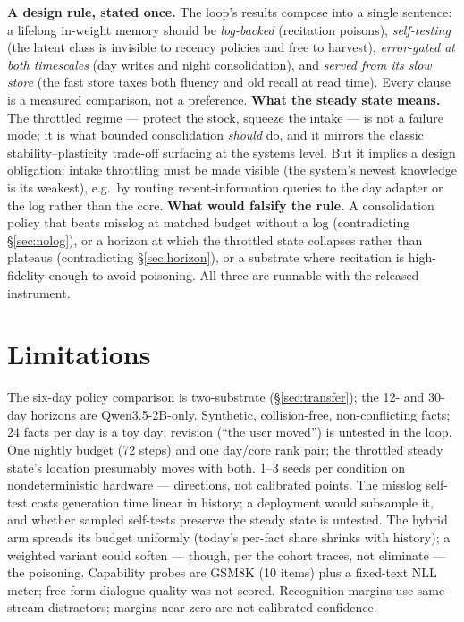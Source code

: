 \documentclass[11pt]{article}
\newcommand{\qwen}{Qwen3.5-2B}
\begin{document}
\textbf{A design rule, stated once.} The loop's results compose into a single sentence: a lifelong
in-weight memory should be \emph{log-backed} (recitation poisons), \emph{self-testing} (the latent
class is invisible to recency policies and free to harvest), \emph{error-gated at both timescales}
(day writes and night consolidation), and \emph{served from its slow store} (the fast store taxes
both fluency and old recall at read time). Every clause is a measured comparison, not a preference.
\textbf{What the steady state means.} The throttled regime --- protect the stock, squeeze the intake
--- is not a failure mode; it is what bounded consolidation \emph{should} do, and it mirrors the
classic stability--plasticity trade-off surfacing at the systems level. But it implies a design
obligation: intake throttling must be made visible (the system's newest knowledge is its weakest),
e.g.\ by routing recent-information queries to the day adapter or the log rather than the core.
\textbf{What would falsify the rule.} A consolidation policy that beats misslog at matched budget
without a log (contradicting \S\ref{sec:nolog}), or a horizon at which the throttled state collapses
rather than plateaus (contradicting \S\ref{sec:horizon}), or a substrate where recitation is
high-fidelity enough to avoid poisoning. All three are runnable with the released instrument.

\section{Limitations}\label{sec:limits}

The six-day policy comparison is two-substrate (\S\ref{sec:transfer}); the 12- and 30-day horizons
are \qwen{}-only. Synthetic, collision-free, non-conflicting facts; 24 facts per day is a toy day;
revision (``the user moved'') is untested in the loop. One nightly budget (72 steps) and one
day/core rank pair; the throttled steady state's location presumably moves with both. 1--3 seeds per
condition on nondeterministic hardware --- directions, not calibrated points. The misslog self-test
costs generation time linear in history; a deployment would subsample it, and whether sampled
self-tests preserve the steady state is untested. The hybrid arm spreads its budget uniformly
(today's per-fact share shrinks with history); a weighted variant could soften --- though, per the
cohort traces, not eliminate --- the poisoning. Capability probes are GSM8K (10 items) plus a
fixed-text NLL meter; free-form dialogue quality was not scored. Recognition margins use same-stream
distractors; margins near zero are not calibrated confidence.
\end{document}
